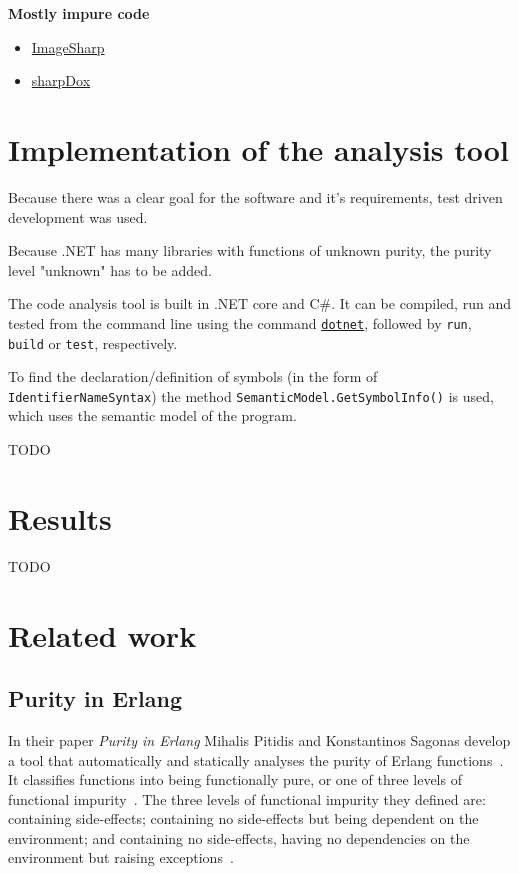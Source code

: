 \documentclass[a4paper,12pt]{article}
\begin{document}
\textbf{Mostly impure code}
\begin{itemize}
  \item \href{https://github.com/SixLabors/ImageSharp/blob/master/src/ImageSharp}{ImageSharp}
  \item \href{https://github.com/geaz/sharpDox}{sharpDox}
\end{itemize}

\section{Implementation of the analysis tool} \label{sec:Implementation of the analysis tool}


Because there was a clear goal for the software and it's requirements, test driven development was used.

Because .NET has many libraries with functions of unknown purity, the purity level "unknown" has to be added.

The code analysis tool is built in .NET core and C\#. It can be compiled, run and tested from the command line using the command \href{https://docs.microsoft.com/en-us/dotnet/core/tools/}{\texttt{dotnet}}, followed by \texttt{run}, \texttt{build} or \texttt{test}, respectively.

To find the declaration/definition of symbols (in the form of \texttt{IdentifierNameSyn\allowbreak tax}) the method \texttt{SemanticModel.GetSym\allowbreak bolInfo()} is used, which uses the semantic model of the program.

TODO

\section{Results} \label{sec:Results}
TODO

\section{Related work} \label{sec:Related work} %

\subsection{Purity in Erlang} \label{sub:Purity-in-Erlang}
In their paper \textit{Purity in Erlang} Mihalis Pitidis and Konstantinos Sagonas develop a tool that automatically and statically analyses the purity of Erlang functions~\cite{pitidis2010purity}. It classifies functions into being functionally pure, or one of three levels of functional impurity~\cite{pitidis2010purity}.
The three levels of functional impurity they defined are: containing side-effects; containing no side-effects but being dependent on the environment; and containing no side-effects, having no dependencies on the environment but raising exceptions~\cite{pitidis2010purity}.
\end{document}
